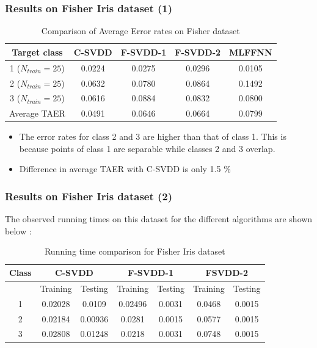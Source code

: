 \documentclass{beamer}
\begin{document}

\begin{frame}
\frametitle{Results on Fisher Iris dataset (1)}
\begin{table}[H]
\begin{center}
\caption{Comparison of Average Error rates on Fisher dataset}
\begin{tabular}{|c|c|c|c|c|}
\hline
Target class & C-SVDD & F-SVDD-1 & F-SVDD-2 & MLFFNN \\ \hline
1 ($N_{train} = 25$) &  0.0224  & 0.0275  & 0.0296  & 0.0105 \\ \hline
2 ($N_{train} = 25$) &  0.0632  &  0.0780  & 0.0864  & 0.1492 \\ \hline
3 ($N_{train} = 25$) & 0.0616  &  0.0884  & 0.0832 & 0.0800 \\ \hline
Average TAER &  0.0491 & 0.0646 &  0.0664 & 0.0799\\ \hline
\end{tabular}
\end{center}
\end{table}

\begin{itemize}
\item The error rates for class 2 and 3 are higher than that of class 1. This is because points
of class 1 are separable while classes 2 and 3 overlap.
\item  Difference in average TAER with C-SVDD is only 1.5 \%
\end{itemize}
\end{frame}



\begin{frame}
\frametitle{Results on Fisher Iris dataset (2)}
The observed running times on this dataset for the different algorithms are shown below :

\begin{table}[H]
\begin{center}
\caption{Running time comparison for Fisher Iris dataset}
\begin{tabular}{|c|c|c|c|c|c|c|}
\hline
Class & \multicolumn{2}{|c|}{C-SVDD} & \multicolumn{2}{|c|}{F-SVDD-1} & \multicolumn{2}{|c|}{FSVDD-2}  \\ \hline
& Training & Testing & Training & Testing & Training & Testing \\ \hline
1  & 0.02028 & 0.0109 & 0.02496  & 0.0031 & 0.0468 & 0.0015 \\ \hline
2  & 0.02184 & 0.00936 & 0.0281  &  0.0015 & 0.0577 & 0.0015 \\ \hline
3  &  0.02808 &  0.01248 & 0.0218  & 0.0031 & 0.0748 & 0.0015 \\ \hline

\end{tabular} \\[5pt]
\end{center}
\end{table}

\end{frame}
\end{document}
